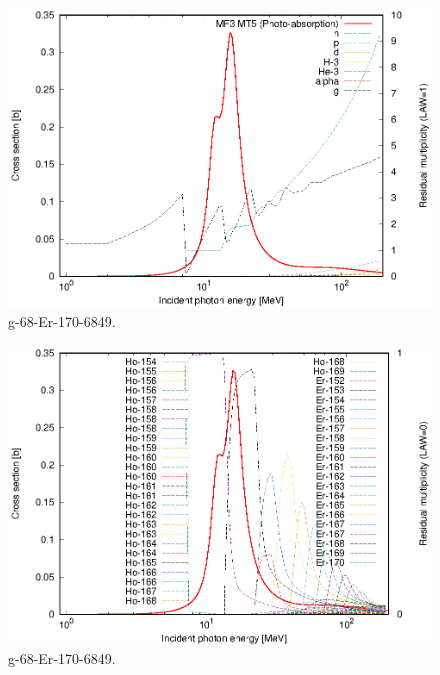 \begin{figure}
 \includegraphics[width=\linewidth]{eps/g_68-Er-170_6849.eps}
  \caption{g-68-Er-170-6849.}
\end{figure}
\begin{figure}
 \includegraphics[width=\linewidth]{eps-law0/g_68-Er-170_6849.eps}
 \caption{g-68-Er-170-6849.}
\end{figure}
\newpage \clearpage

